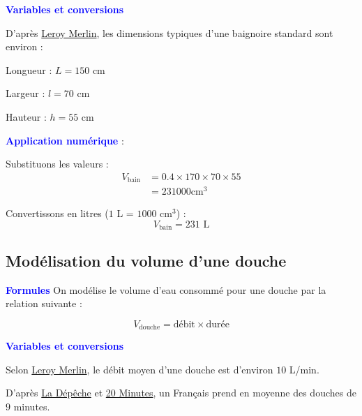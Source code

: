 \documentclass[a4paper,12pt]{article}
\begin{document}
\textbf{\textcolor{blue}{Variables et conversions}}

\vspace{1em}

D'après \href{https://www.leroymerlin.fr/comment-choisir/comment-choisir-sa-baignoire.html#quelle-est-la-bonne-taille-pour-une-baignoire-?}{Leroy Merlin}, les dimensions typiques d'une baignoire standard sont environ :
\begin{compactitem}
    \item Longueur : $L = 150$ cm
    \item Largeur : $l = 70$ cm
    \item Hauteur : $h = 55$ cm
\end{compactitem}

\textbf{\textcolor{blue}{Application numérique}} : 

\vspace{1em}

Substituons les valeurs :
\begin{align}
    V_{\text{bain}} &= 0.4 \times 170 \times 70 \times 55 \\
    &= 231 000 \text{cm$^3$}
\end{align}

Convertissons en litres ($1$ L = $1000$ cm$^3$) :
\begin{equation}
    V_{\text{bain}} = 231 \text{ L}
\end{equation}

\subsection*{Modélisation du volume d'une douche}

\textbf{\textcolor{blue}{Formules}} 
\vspace{1em}
On modélise le volume d'eau consommé pour une douche par la relation suivante : 

\vspace{1em}

\begin{equation}
    V_{\text{douche}} = \text{débit} \times \text{durée}
\end{equation}

\textbf{\textcolor{blue}{Variables et conversions}}
\vspace{1em}
\begin{compactitem}
  \item Selon \href{https://www.leroymerlin.fr/comment-choisir/comment-choisir-son-pommeau-de-douche.html}{Leroy Merlin}, le débit moyen d'une douche est d'environ $10$ L/min. 
  \item D'après \href{https://www.ladepeche.fr/2023/01/16/combien-de-temps-doit-durer-une-douche-pour-preserver-son-budget-et-lenvironnement-10929452.php#:~:text=Aux%20Etats%2DUnis%2C%20l',en%20moyenne%20pour%20les%20Fran%C3%A7ais.}{La Dépêche} et \href{https://www.20minutes.fr/societe/1616727-20150527-francais-passent-moyenne-9-minutes-sous-douche}{20 Minutes}, un Français prend en moyenne des douches de $9$ minutes.
\end{compactitem}
\end{document}
